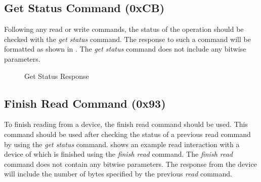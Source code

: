 \subsection{Get Status Command (0xCB)}

Following any read or write commands, the status of the operation should be checked with the \textit{get status} command. The response to such a command will be formatted as shown in . The \textit{get status} command does not include any bitwise parameters.


\begin{figure}
	\caption{Get Status Response}
	\label{fig:statusresponse}
\end{figure}


\subsection{Finish Read Command (0x93)}

To finish reading from a device, the finish read command should be used. This command should be used after checking the status of a previous read command by using the \textit{get status} command.  shows an example read interaction with a device of which is finished using the \textit{finish read} command. The \textit{finish read} command does not contain any bitwise parameters. The response from the device will include the number of bytes specified by the previous \textit{read} command.


